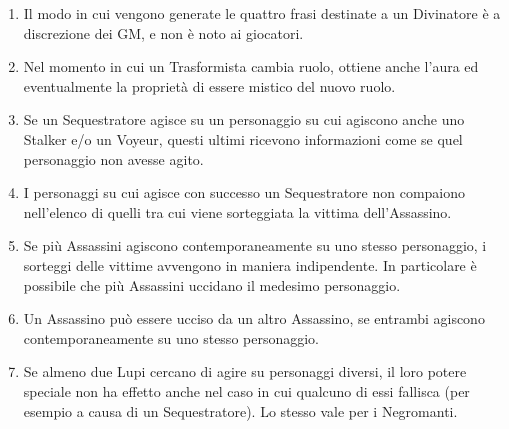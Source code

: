 \documentclass[a4paper,10pt]{article}
\begin{document}
\begin{enumerate}
 \item Il modo in cui vengono generate le quattro frasi destinate a un Divinatore è a discrezione dei GM, e non è noto ai giocatori.
 
 \item Nel momento in cui un Trasformista cambia ruolo, ottiene anche l'aura ed eventualmente la proprietà di essere mistico del nuovo ruolo.
 
 \item Se un Sequestratore agisce su un personaggio su cui agiscono anche uno Stalker e/o un Voyeur, questi ultimi ricevono informazioni come se quel personaggio non avesse agito.
 
 \item I personaggi su cui agisce con successo un Sequestratore non compaiono nell'elenco di quelli tra cui viene sorteggiata la vittima dell'Assassino.
 
 \item Se più Assassini agiscono contemporaneamente su uno stesso personaggio, i sorteggi delle vittime avvengono in maniera indipendente.
 In particolare è possibile che più Assassini uccidano il medesimo personaggio.
 
 \item Un Assassino può essere ucciso da un altro Assassino, se entrambi agiscono contemporaneamente su uno stesso personaggio.
 
 \item Se almeno due Lupi cercano di agire su personaggi diversi, il loro potere speciale non ha effetto anche nel caso in cui qualcuno di essi fallisca (per esempio a causa di un Sequestratore).
 Lo stesso vale per i Negromanti.
\end{enumerate}



\printindex
\end{document}
